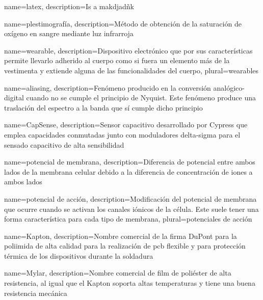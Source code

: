 
{
	name=latex,
	description={Is a makdjadñk}
}

{
	name={plestimografía},
	description={Método de obtención de la saturación de oxígeno en sangre mediante luz infrarroja}
}

{
	name={wearable},
	description={Dispositivo electrónico que por sus características permite llevarlo adherido al cuerpo como si fuera un elemento más de la vestimenta y extiende alguna de las funcionalidades del cuerpo},
	plural={wearables}
}

{
	name={aliasing},
	description={Fenómeno producido en la conversión analógico-digital cuando no se cumple el principio de Nyquist. Este fenómeno produce una traslación del espectro a la banda que sí cumple dicho principio}
}

{
	name={CapSense},
	description={Sensor capacitivo desarrollado por Cypress que emplea capacidades conmutadas junto con moduladores delta-sigma para el sensado capacitivo de alta sensibilidad}
}

{	name={potencial de membrana},
	description={Diferencia de potencial entre ambos lados de la membrana celular debido a la diferencia de concentración de iones a ambos lados}
}


{
	name={potencial de acción},
	description={Modificación del potencial de membrana que ocurre cuando se activan los canales iónicos de la célula. Este suele tener una forma característica para cada tipo de membrana},
	plural={potenciales de acción}
}

{
	name={Kapton},
	description={Nombre comercial de la firma DuPont para la poliimida de alta calidad para la realización de \acrshort{pcb} flexible y para protección térmica de los dispositivos durante la soldadura}
}

{
	name={Mylar},
	description={Nombre comercial de film de poliéster de alta resistencia, al igual que el Kapton soporta altas temperaturas y tiene una buena resistencia mecánica}
}


